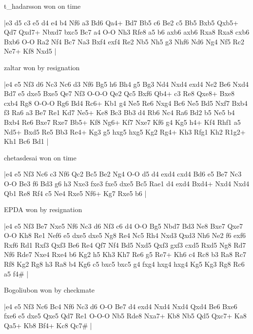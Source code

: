 \showboard

t\_hadarsson won on time

\makegametitle
|e3 d5 c3 e5 d4 e4 b4 Nf6 a3 Bd6 Qa4+ Bd7 Bb5 c6 Be2 c5 Bb5 Bxb5 Qxb5+ Qd7 Qxd7+ Nbxd7 bxc5 Bc7 a4 O-O Nh3 Rfe8 a5 b6 axb6 axb6 Rxa8 Rxa8 cxb6 Bxb6 O-O Ra2 Nf4 Bc7 Na3 Bxf4 exf4 Re2 Nb5 Nh5 g3 Nhf6 Nd6 Ng4 Nf5 Rc2 Ne7+ Kf8 Nxd5  |

\showboard

zaltar won by resignation

\makegametitle
|e4 e5 Nf3 d6 Nc3 Nc6 d3 Nf6 Bg5 h6 Bh4 g5 Bg3 Nd4 Nxd4 exd4 Ne2 Be6 Nxd4 Bd7 e5 dxe5 Bxe5 Qe7 Nf3 O-O-O Qe2 Qc5 Bxf6 Qb4+ c3 Re8 Qxe8+ Bxe8 cxb4 Rg8 O-O-O Rg6 Bd4 Rc6+ Kb1 g4 Ne5 Re6 Nxg4 Bc6 Ne5 Bd5 Nxf7 Bxb4 f3 Ra6 a3 Be7 Re1 Kd7 Ne5+ Ke8 Bc3 Bb3 d4 Rb6 Nc4 Ra6 Bd2 b5 Ne5 b4 Bxb4 Re6 Bxe7 Rxe7 Bb5+ Kf8 Ng6+ Kf7 Nxe7 Kf6 g4 Kg5 h4+ Kf4 Rhf1 a5 Nd5+ Bxd5 Re5 Bb3 Re4+ Kg3 g5 hxg5 hxg5 Kg2 Rg4+ Kh3 Rfg1 Kh2 R1g2+ Kh1 Bc6 Bd1  |

\showboard

chetasdesai won on time

\makegametitle
|e4 e5 Nf3 Nc6 c3 Nf6 Qc2 Bc5 Be2 Ng4 O-O d5 d4 exd4 cxd4 Bd6 e5 Be7 Nc3 O-O Be3 f6 Bd3 g6 h3 Nxe3 fxe3 fxe5 dxe5 Bc5 Rae1 d4 exd4 Bxd4+ Nxd4 Nxd4 Qb1 Re8 Rf4 c5 Ne4 Rxe5 Nf6+ Kg7 Rxe5 b6  |

\showboard

EPDA won by resignation

\makegametitle
|e4 e5 Nf3 Be7 Nxe5 Nf6 Nc3 d6 Nf3 c6 d4 O-O Bg5 Nbd7 Bd3 Ne8 Bxe7 Qxe7 O-O Kh8 Re1 Nef6 e5 dxe5 dxe5 Ng8 Re4 Nc5 Rh4 Nxd3 Qxd3 Nh6 Ne2 f6 exf6 Rxf6 Rd1 Rxf3 Qxf3 Be6 Re4 Qf7 Nf4 Bd5 Nxd5 Qxf3 gxf3 cxd5 Rxd5 Ng8 Rd7 Nf6 Rde7 Nxe4 Rxe4 b6 Kg2 h5 Kh3 Kh7 Re6 g5 Re7+ Kh6 c4 Rc8 b3 Ra8 Rc7 Rf8 Kg2 Rg8 h3 Ra8 b4 Kg6 c5 bxc5 bxc5 g4 fxg4 hxg4 hxg4 Kg5 Kg3 Rg8 Rc6 a5 f4\#  |

\showboard

Bogoliubon won by checkmate

\makegametitle
|e4 e5 Nf3 Nc6 Bc4 Nf6 Nc3 d6 O-O Be7 d4 exd4 Nxd4 Nxd4 Qxd4 Be6 Bxe6 fxe6 e5 dxe5 Qxe5 Qd7 Re1 O-O-O Nb5 Rde8 Nxa7+ Kb8 Nb5 Qd5 Qxc7+ Ka8 Qa5+ Kb8 Bf4+ Kc8 Qc7\#  |

